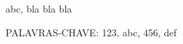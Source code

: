\begin{resumo}

\noindent abc, bla bla bla

\noindent PALAVRAS-CHAVE: 123, abc, 456, def

\end{resumo}
